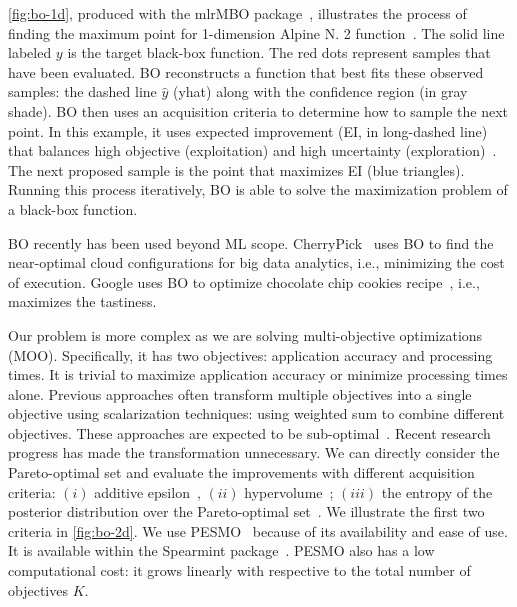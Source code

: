 \autoref{fig:bo-1d}, produced with the mlrMBO package~\cite{bischl2017mlrmbo},
illustrates the process of finding the maximum point for 1-dimension Alpine N. 2
function~\cite{clerc1999swarm}. The solid line labeled $y$ is the target
black-box function. The red dots represent samples that have been evaluated. BO
reconstructs a function that best fits these observed samples: the dashed line
$\hat{y}$ (yhat) along with the confidence region (in gray shade).  BO then uses
an acquisition criteria to determine how to sample the next point.  In this
example, it uses expected improvement (EI, in long-dashed line) that balances
high objective (exploitation) and high uncertainty
(exploration)~\cite{shahriari2016taking}. The next proposed sample is the point
that maximizes EI (blue triangles). Running this process iteratively, BO is able
to solve the maximization problem of a black-box function.


BO recently has been used beyond ML scope.
CherryPick~\cite{alipourfard2017cherrypick} uses BO to find the near-optimal
cloud configurations for big data analytics, i.e., minimizing the cost of
execution. Google uses BO to optimize chocolate chip cookies
recipe~\cite{solnik2017bayesian}, i.e., maximizes the tastiness.

Our problem is more complex as we are solving multi-objective optimizations
(MOO). Specifically, it has two objectives: application accuracy and processing
times. It is trivial to maximize application accuracy or minimize processing
times alone. Previous approaches often transform multiple objectives into a
single objective using scalarization techniques: using weighted sum to combine
different objectives. These approaches are expected to be
sub-optimal~\cite{knowles2006parego}. Recent research progress has made the
transformation unnecessary. We can directly consider the Pareto-optimal set and
evaluate the improvements with different acquisition criteria: $(i)$ additive
epsilon~\cite{binoisgpareto}, $(ii)$ hypervolume~\cite{binoisgpareto}; $(iii)$
the entropy of the posterior distribution over the Pareto-optimal
set~\cite{hernandez2016predictive}. We illustrate the first two criteria in
\autoref{fig:bo-2d}. We use PESMO~\cite{hernandez2016predictive} because of its
availability and ease of use. It is available within the Spearmint
package~\cite{snoek2016spearmint}.  PESMO also has a low computational cost: it
grows linearly with respective to the total number of objectives $K$.



